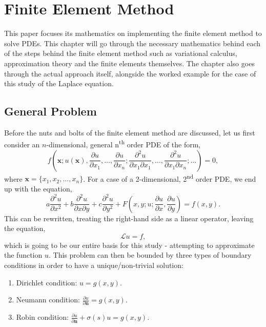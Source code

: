 \clearpage
\chapter{Finite Element Method}

This paper focuses its mathematics on implementing the finite element method to solve PDEs. This chapter will go through the necessary mathematics behind each of the steps behind the finite element method such as variational calculus, approximation theory and the finite elements themselves. The chapter also goes through the actual approach itself, alongside the worked example for the case of this study of the Laplace equation.

\section{General Problem}

Before the nuts and bolts of the finite element method are discussed, let us first consider an $n$-dimensional, general n\textsuperscript{th} order PDE of the form,
\begin{equation}
	f(\textbf{x}; u(\textbf{x}), \frac{\partial u}{\partial x_1},\dots, \frac{\partial u}{\partial x_n}; \frac{\partial^2 u}{\partial x_1 \partial x_1},\dots, \frac{\partial^2 u}{\partial x_1 \partial x_n}; \dots) = 0,
\end{equation}
where $\textbf{x} = \{x_1,x_2,\dots,x_n\}$.
For a case of a 2-dimensional, 2\textsuperscript{nd} order PDE, we end up with the equation,
\begin{equation}
	a \frac{\partial^2 u}{\partial x^2} + b \frac{\partial^2 u}{\partial x \partial y} + c \frac{\partial^2 u}{\partial y^2} + F\left(x,y; u; \frac{\partial u}{\partial x}, \frac{\partial u}{\partial y}\right) = f(x,y).
\end{equation}
This can be rewritten, treating the right-hand side as a linear operator, leaving the equation,
\begin{equation}
	\mathcal{L}u = f,
\end{equation}
which is going to be our entire basis for this study - attempting to approximate the function $u$. This problem can then be bounded by three types of boundary conditions in order to have a unique/non-trivial solution:
\begin{enumerate}
	\item Dirichlet condition: $u=g(x,y)$.
	\item Neumann condition: $\frac{\partial u}{\partial \textbf{n}} = g(x,y)$.
	\item Robin condition: $\frac{\partial u}{\partial \textbf{n}} + \sigma(s)u = g(x,y)$.
\end{enumerate}
